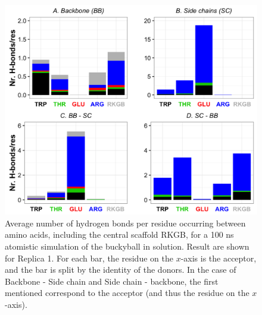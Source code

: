 \begin{figure}[t]
\centering
\includegraphics[width=0.85\linewidth]{3results_capsule/pics/Hb_all.png} 
\caption[Hydrogen bonds in the buckyball molecule]{Average number of hydrogen bonds per residue occurring between amino acids, including the central scaffold RKGB, for a 100 ns atomistic simulation of the buckyball in solution. Result are shown for Replica 1. For each bar, the residue on the $x$-axis is the acceptor, and the bar is split by the identity of the donors. In the case of Backbone - Side chain and Side chain - backbone, the first mentioned correspond to the acceptor (and thus the residue on the $x$-axis).}
\label{fig:BTI_hbonds}
\end{figure}

